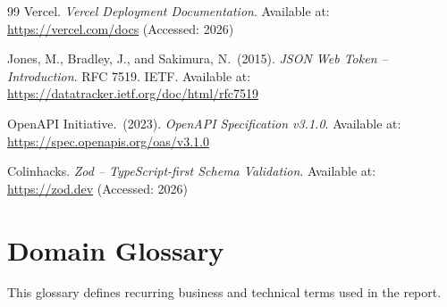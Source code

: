 ﻿\documentclass[12pt,a4paper]{report}
\begin{document}
\begin{thebibliography}{99}
    Vercel.
    \textit{Vercel Deployment Documentation}.
    Available at: \url{https://vercel.com/docs}
    (Accessed: 2026)

    Jones, M., Bradley, J., and Sakimura, N.\ (2015).
    \textit{JSON Web Token -- Introduction}.
    RFC 7519. IETF.
    Available at: \url{https://datatracker.ietf.org/doc/html/rfc7519}

    OpenAPI Initiative.\ (2023).
    \textit{OpenAPI Specification v3.1.0}.
    Available at: \url{https://spec.openapis.org/oas/v3.1.0}

    Colinhacks.
    \textit{Zod -- TypeScript-first Schema Validation}.
    Available at: \url{https://zod.dev}
    (Accessed: 2026)

\end{thebibliography}

\appendix

\chapter{Domain Glossary}
\label{app:glossary}

This glossary defines recurring business and technical terms used in the report.
\end{document}
